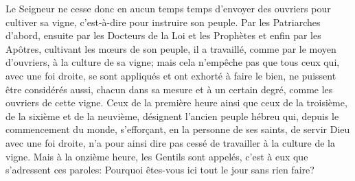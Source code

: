 Le Seigneur ne cesse donc en aucun temps temps
	d’envoyer des ouvriers pour cultiver sa vigne,
	c’est-à-dire pour instruire son peuple.
Par les Patriarches d’abord,
	ensuite par les Docteurs de la Loi et les Prophètes
		et enfin par les Apôtres,
	cultivant les mœurs de son peuple, il a travaillé,
	comme par le moyen d’ouvriers, à la culture de sa vigne;
	mais cela n’empêche pas que tous ceux qui, avec une foi droite,
	se sont appliqués et ont exhorté à faire le bien,
	ne puissent être considérés aussi,
		chacun dans sa mesure et à un certain degré,
	comme les ouvriers de cette vigne.
Ceux de la première heure
	ainsi que ceux de la troisième, de la sixième et de la neuvième,
	désignent l’ancien peuple hébreu qui, depuis le commencement du monde,
	s’efforçant, en la personne de ses saints,
		de servir Dieu avec une foi droite,
	n’a pour ainsi dire pas cessé de travailler à la culture de la vigne.
Mais à la onzième heure, les Gentils sont appelés,
	c’est à eux que s’adressent ces paroles:
	Pourquoi êtes-vous ici tout le jour sans rien faire?
